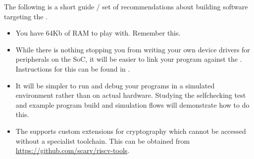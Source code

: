 
The following is a short guide / set of recommendations about building
software targeting the \SCARVSOC.

\begin{itemize}

\item You have $64$Kb of RAM to play with. Remember this.

\item While there is nothing stopping you from writing your own
    device drivers for peripherals on the SoC, it will be easier
    to link your program against the \SCARVSOC.
    Instructions for this can be found in .

\item It will be simpler to run and debug your programs in a simulated
    environment rather than on actual hardware.
    Studying the selfchecking test and example program build and
    simulation flows will demonstrate how to do this.

\item The \SCARVCPU supports custom extensions for cryptography
    which cannot be accessed without a specialist toolchain.
    This can be obtained from
    \url{https://github.com/scarv/riscv-tools}.

\end{itemize}

